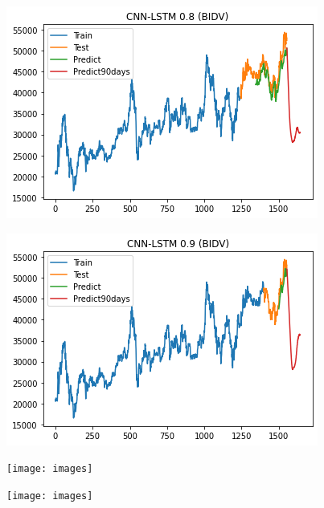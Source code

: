 \documentclass[conference]{IEEEtran}
\begin{document}
\begin{minipage}{0.23\textwidth}
    \centering
    \includegraphics[width=\linewidth]{images/CNN-LSTM/CNNLSTM_BIDV_90days_82.png}
    \label{fig:image1}
\end{minipage}
\hfill
\begin{minipage}{0.23\textwidth}
    \centering
    \includegraphics[width=\linewidth]{images/CNN-LSTM/CNNLSTM_BIDV_90days_91.png}
    \label{fig:image2}
\end{minipage}

\begin{minipage}{0.23\textwidth}
    \centering
    \texttt{[image: images]}
    \label{fig:image1}
\end{minipage}
\hfill
\begin{minipage}{0.23\textwidth}
    \centering
    \texttt{[image: images]}
    \label{fig:image2}
\end{minipage}
\end{document}
